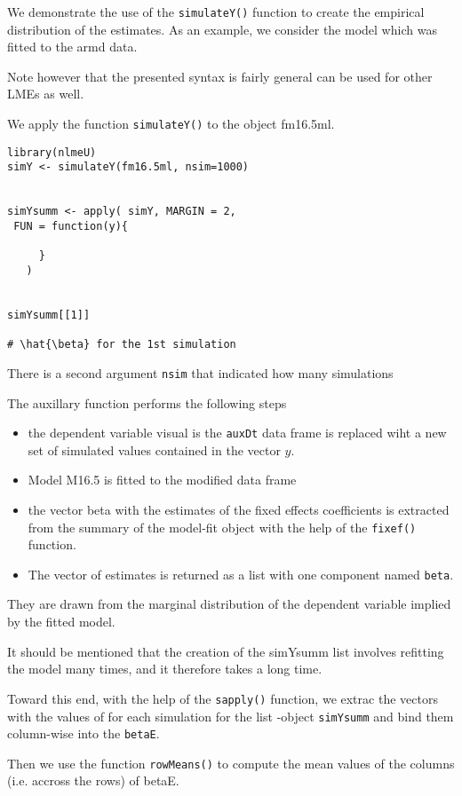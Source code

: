 \documentclass[a4paper,12pt]{article}
\begin{document}
We demonstrate the use of the \texttt{simulateY()} function to create the empirical distribution of the \textbf{\beta} estimates.
As an example, we consider the model which was fitted to the armd data.

Note however that the presented syntax is fairly general can be used for other LMEs as well.

We apply the function \texttt{simulateY()} to the object fm16.5ml.



\begin{framed}
\begin{verbatim}
library(nlmeU)
simY <- simulateY(fm16.5ml, nsim=1000)


simYsumm <- apply( simY, MARGIN = 2, 
 FUN = function(y){

     }
   )


simYsumm[[1]]

# \hat{\beta} for the 1st simulation
\end{verbatim}
\end{framed}

There is a second argument \texttt{nsim} that indicated how many simulations 

The auxillary function performs the following steps

\begin{itemize}
\item the dependent variable visual is the \texttt{auxDt} data frame is replaced wiht a new set of simulated values contained in the vector $y$.
\item Model M16.5 is fitted to the modified data frame
\item the vector beta with the estimates of the fixed effects coefficients is extracted from the summary of the model-fit object with the help of the \texttt{fixef()} function.
\item The vector of estimates is returned as a list with one component named \texttt{beta}.
\end{itemize}

They are drawn from the marginal distribution of the dependent variable implied by the fitted model.



It should be mentioned that the creation of the simYsumm list involves refitting the model many times, and it therefore takes a long time.

Toward this end, with the help of the \texttt{sapply()} function, we extrac the vectors with the values of \hat{\beta} for each simulation for the list
-object \texttt{simYsumm} and bind them column-wise into the \texttt{betaE}.

Then we use the function \texttt{rowMeans()} to compute the mean values of the columns (i.e. accross the rows) of betaE.



\end{document}
